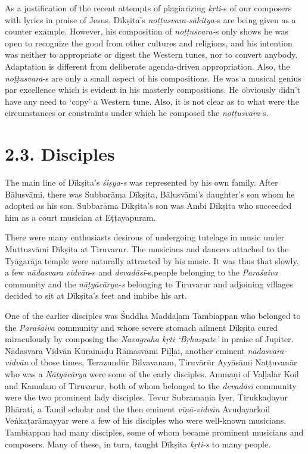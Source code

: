 As a justification of the recent attempts of plagiarizing \textit{kṛti}-s of our composers with lyrics in praise of Jesus, Dīkṣita’s \textit{noṭṭusvara-sāhitya}-s are being given as a counter example. However, his composition of \textit{noṭṭusvara-}s only shows he was open to recognize the good from other cultures and religions, and his intention was neither to appropriate or digest the Western tunes, nor to convert anybody. Adaptation is different from deliberate agenda-driven appropriation. Also, the \textit{noṭṭusvara}-s are only a small aspect of his compositions. He was a musical genius par excellence which is evident in his masterly compositions. He obviously didn’t have any need to ‘copy’ a Western tune. Also, it is not clear as to what were the circumstances or constraints under which he composed the \textit{noṭṭusvara}-s.


\section*{2.3. Disciples}

The main line of Dīkṣita’s \textit{śiṣya-s} was represented by his own family. After Bālusvāmi, there was Subbarāma Dīkṣita, Bālusvāmi’s daughter’s son whom he adopted as his son. Subbarāma Dīkṣita’s son was Ambi Dīkṣita who succeeded him as a court musician at Eṭṭayapuram.

There were many enthusiasts desirous of undergoing tutelage in music under Muttusvāmi Dīkṣita at Tiruvarur. The musicians and dancers attached to the Tyāgarāja temple were naturally attracted by his music. It was thus that slowly, a few \textit{nādasvara vidvān}-s and \textit{devadāsī}-s,\break people belonging to the \textit{Paraśaiva} community and the \textit{nāṭyācārya-s} belonging to Tiruvarur and adjoining villages decided to sit at Dīkṣita's feet and imbibe his art.

One of the earlier disciples was Śuddha Maddaḷam Tambiappan who belonged to the \textit{Paraśaiva} community and whose severe stomach ailment Dīkṣita cured miraculously by composing the \textit{Navagraha kṛti ‘Bṛhaspate’} in praise of Jupiter. Nādasvara Vidvān Kūraināḍu Rāmasvāmi Piḷḷai, another eminent \textit{nādasvara-vidvān} of those times, Terazundūr Bilvavanam, Tiruvārūr Ayyāsāmi Naṭṭuvanār who was a \textit{Nāṭyācārya} were some of the early disciples. Ammaṇi of Vaḷḷalar Koil and Kamalam of Tiruvarur, both of whom belonged to the \textit{devadāsī} community were the two prominent lady disciples. Tevur Subramaṇia Iyer, Tirukkaḍayur Bhārati, a Tamil scholar and the then eminent \textit{vīṇā-vidvān} Avuḍayarkoil Veṅkaṭarāmayyar were a few of his disciples who were well-known musicians. Tambiappan had many disciples, some of whom became prominent musicians and composers. Many of these, in turn, taught Dīkṣita \textit{kṛti-s} to many people.

